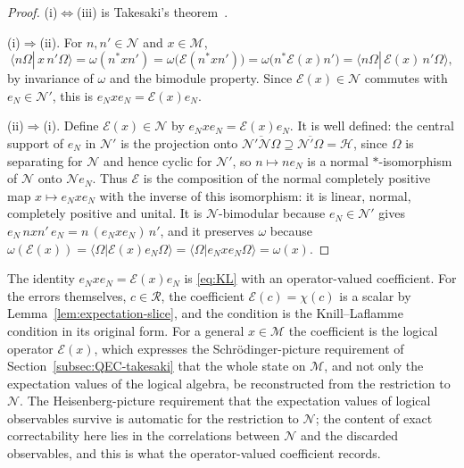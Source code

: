 \documentclass[a4paper,11pt]{article}
\theoremstyle{definition}
\newcommand{\mE}{\mathcal{E}}
\begin{document}
\begin{proof}
(i)$\Leftrightarrow$(iii) is Takesaki's theorem~\cite{Takesaki1972}.

(i)$\Rightarrow$(ii). For $n,n'\in\mathcal N$ and $x\in\mathcal M$,
\[
 \langle n\Omega|\,x\,n'\Omega\rangle=\omega(n^*xn')=\omega\bigl(\mE(n^*xn')\bigr)=\omega\bigl(n^*\mE(x)n'\bigr)=\langle n\Omega|\,\mE(x)\,n'\Omega\rangle,
\]
by invariance of $\omega$ and the bimodule property. Since $\mE(x)\in\mathcal N$ commutes with $e_N\in\mathcal N'$, this is $e_Nxe_N=\mE(x)e_N$.

(ii)$\Rightarrow$(i). Define $\mE(x)\in\mathcal N$ by $e_Nxe_N=\mE(x)e_N$. It is well defined: the central support of $e_N$ in $\mathcal N'$ is the projection onto $\overline{\mathcal N'\mathcal N\Omega}\supseteq\overline{\mathcal N'\Omega}=\mathcal H$, since $\Omega$ is separating for $\mathcal N$ and hence cyclic for $\mathcal N'$, so $n\mapsto ne_N$ is a normal $*$-isomorphism of $\mathcal N$ onto $\mathcal Ne_N$. Thus $\mE$ is the composition of the normal completely positive map $x\mapsto e_Nxe_N$ with the inverse of this isomorphism: it is linear, normal, completely positive and unital. It is $\mathcal N$-bimodular because $e_N\in\mathcal N'$ gives $e_N\,nxn'\,e_N=n\,(e_Nxe_N)\,n'$, and it preserves $\omega$ because $\omega(\mE(x))=\langle\Omega|\mE(x)e_N\Omega\rangle=\langle\Omega|e_Nxe_N\Omega\rangle=\omega(x)$.
\end{proof}

The identity $e_Nxe_N=\mE(x)e_N$ is \eqref{eq:KL} with an operator-valued coefficient. For the errors themselves, $c\in\mathcal R$, the coefficient $\mE(c)=\chi(c)$ is a scalar by Lemma~\ref{lem:expectation-slice}, and the condition is the Knill--Laflamme condition in its original form. For a general $x\in\mathcal M$ the coefficient is the logical operator $\mE(x)$, which expresses the Schr\"odinger-picture requirement of Section~\ref{subsec:QEC-takesaki} that the whole state on $\mathcal M$, and not only the expectation values of the logical algebra, be reconstructed from the restriction to $\mathcal N$. The Heisenberg-picture requirement that the expectation values of logical observables survive is automatic for the restriction to $\mathcal N$; the content of exact correctability here lies in the correlations between $\mathcal N$ and the discarded observables, and this is what the operator-valued coefficient records.
\end{document}
